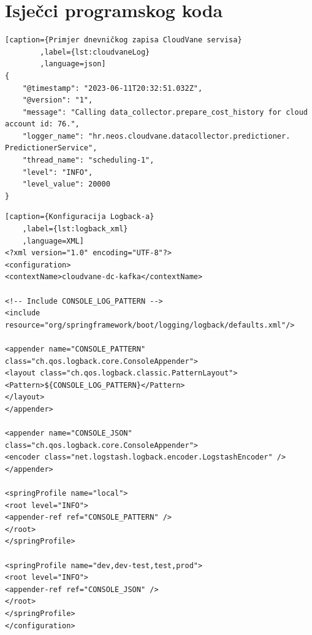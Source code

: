 \documentclass[times, utf8, diplomski]{fer}
\begin{document}
\appendix
\chapter{Isječci programskog koda}
\label{sec:code}


\begin{lstlisting}[caption={Primjer dnevničkog zapisa CloudVane servisa}
		,label={lst:cloudvaneLog}
		,language=json]
{
	"@timestamp": "2023-06-11T20:32:51.032Z",
	"@version": "1",
	"message": "Calling data_collector.prepare_cost_history for cloud account id: 76.",
	"logger_name": "hr.neos.cloudvane.datacollector.predictioner. PredictionerService",
	"thread_name": "scheduling-1",
	"level": "INFO",
	"level_value": 20000
}
\end{lstlisting}

\clearpage
\begin{lstlisting}[caption={Konfiguracija Logback-a}
	,label={lst:logback_xml}
	,language=XML]
<?xml version="1.0" encoding="UTF-8"?>
<configuration>
<contextName>cloudvane-dc-kafka</contextName>

<!-- Include CONSOLE_LOG_PATTERN -->
<include resource="org/springframework/boot/logging/logback/defaults.xml"/>

<appender name="CONSOLE_PATTERN" class="ch.qos.logback.core.ConsoleAppender">
<layout class="ch.qos.logback.classic.PatternLayout">
<Pattern>${CONSOLE_LOG_PATTERN}</Pattern>
</layout>
</appender>

<appender name="CONSOLE_JSON" class="ch.qos.logback.core.ConsoleAppender">
<encoder class="net.logstash.logback.encoder.LogstashEncoder" />
</appender>

<springProfile name="local">
<root level="INFO">
<appender-ref ref="CONSOLE_PATTERN" />
</root>
</springProfile>

<springProfile name="dev,dev-test,test,prod">
<root level="INFO">
<appender-ref ref="CONSOLE_JSON" />
</root>
</springProfile>
</configuration>
\end{lstlisting}
\end{document}
